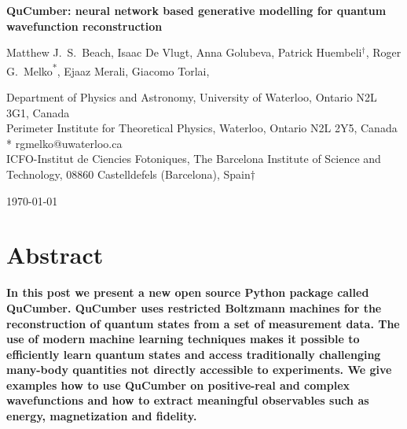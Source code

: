 \documentclass[submission, Phys]{SciPost}
\begin{document}
\begin{center}{\Large \textbf{
QuCumber: neural network based generative modelling for quantum wavefunction reconstruction
}}\end{center}

\begin{center}
Matthew J.~S.~Beach,
Isaac De Vlugt,
Anna Golubeva,
Patrick Huembeli$^\dag$,
Roger G.~Melko\textsuperscript{*},
Ejaaz Merali,
Giacomo Torlai,
\end{center}

\begin{center}
Department of Physics and Astronomy, University of Waterloo, Ontario N2L 3G1, Canada
\\
Perimeter Institute for Theoretical Physics, Waterloo, Ontario N2L 2Y5, Canada
* rgmelko@uwaterloo.ca \\
ICFO-Institut  de  Ciencies  Fotoniques,  The  Barcelona  Institute  of Science  and  Technology, 08860  Castelldefels  (Barcelona),  Spain$\dag$
\end{center}

\begin{center}
\today
\end{center}


\section*{Abstract}
{\bf
In this post we present a new open source Python package called QuCumber.  QuCumber uses restricted Boltzmann machines 
for the reconstruction of quantum states from a set of measurement data. The use of modern machine learning techniques makes it possible to efficiently learn quantum states and access traditionally challenging many-body quantities not directly accessible to experiments. We give examples how to use QuCumber on positive-real and complex wavefunctions and how to extract meaningful observables such as energy, magnetization and fidelity.
}
\end{document}
